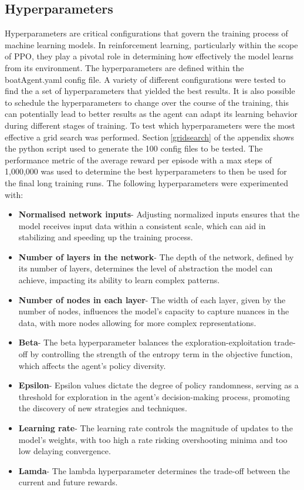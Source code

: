 \subsection{Hyperparameters}\label{sec:hyperparameters}
Hyperparameters are critical configurations that govern the training process of machine learning models. In reinforcement learning, particularly within the scope of PPO, they play a pivotal role in determining how effectively the model learns from its environment. The hyperparameters are defined within the boatAgent.yaml config file. A variety of different configurations were tested to find the a set of hyperparameters that yielded the best results. It is also possible to schedule the hyperparameters to change over the course of the training, this can potentially lead to better results as the agent can adapt its learning behavior during different stages of training. To test which hyperparameters were the most effective a grid search was performed. Section$~$\ref{gridsearch} of the appendix shows the python script used to generate the 100 config files to be tested. The performance metric of the average reward per episode with a max steps of 1,000,000 was used to determine the best hyperparameters to then be used for the final long training runs. The following hyperparameters were experimented with:
\begin{itemize}
    \item \textbf{Normalised network inputs}- Adjusting normalized inputs ensures that the model receives input data within a consistent scale, which can aid in stabilizing and speeding up the training process.
    \item \textbf{Number of layers in the network}- The depth of the network, defined by its number of layers, determines the level of abstraction the model can achieve, impacting its ability to learn complex patterns.
    \item \textbf{Number of nodes in each layer}- The width of each layer, given by the number of nodes, influences the model's capacity to capture nuances in the data, with more nodes allowing for more complex representations.
    \item \textbf{Beta}- The beta hyperparameter balances the exploration-exploitation trade-off by controlling the strength of the entropy term in the objective function, which affects the agent's policy diversity.
    \item \textbf{Epsilon}- Epsilon values dictate the degree of policy randomness, serving as a threshold for exploration in the agent's decision-making process, promoting the discovery of new strategies and techniques.
    \item \textbf{Learning rate}- The learning rate controls the magnitude of updates to the model's weights, with too high a rate risking overshooting minima and too low delaying convergence.
    \item \textbf{Lamda}- The lambda hyperparameter determines the trade-off between the current and future rewards.
\end{itemize}

